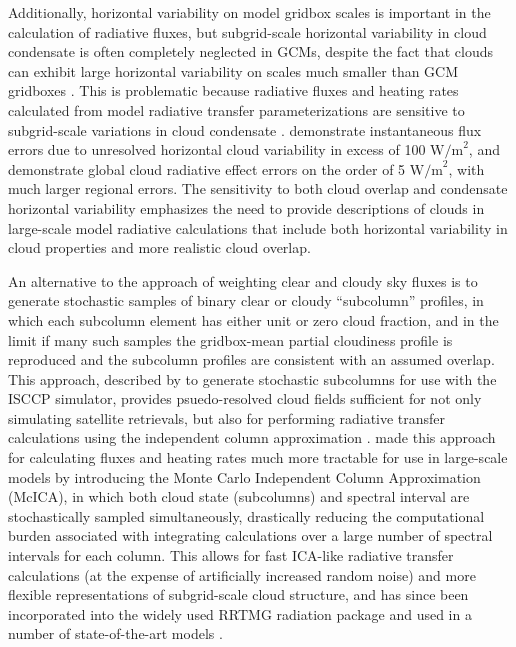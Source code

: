 Additionally, horizontal variability on model gridbox scales is
important in the calculation of radiative fluxes, but subgrid-scale
horizontal variability in cloud condensate is often completely neglected
in GCMs, despite the fact that clouds can exhibit large horizontal
variability on scales much smaller than GCM gridboxes
\citep[e.g.,][]{stephens_and_platt_1987}. This is problematic because
radiative fluxes and heating rates calculated from model radiative
transfer parameterizations are sensitive to subgrid-scale variations in
cloud condensate
\citep[e.g.,][]{barker_et_al_1999, wu_and_liang_2005, oreopoulos_et_al_2012}.
\citet{barker_et_al_1999} demonstrate instantaneous flux errors due to
unresolved horizontal cloud variability in excess of 100
\(\textrm{W/m}^2\), and \citet{oreopoulos_et_al_2012} demonstrate global
cloud radiative effect errors on the order of 5 \(\textrm{W/m}^2\), with
much larger regional errors. The sensitivity to both cloud overlap and
condensate horizontal variability emphasizes the need to provide
descriptions of clouds in large-scale model radiative calculations that
include both horizontal variability in cloud properties and more
realistic cloud overlap.

An alternative to the approach of weighting clear and cloudy sky fluxes
is to generate stochastic samples of binary clear or cloudy
``subcolumn'' profiles, in which each subcolumn element has either unit
or zero cloud fraction, and in the limit if many such samples the
gridbox-mean partial cloudiness profile is reproduced and the subcolumn
profiles are consistent with an assumed overlap. This approach,
described by \citet{klein_and_jakob_1999} to generate stochastic
subcolumns for use with the ISCCP simulator, provides psuedo-resolved
cloud fields sufficient for not only simulating satellite retrievals,
but also for performing radiative transfer calculations using the
independent column approximation \citep[ICA;][]{cahalan_et_al_1994}.
\citet{pincus_et_al_2003} made this approach for calculating fluxes and
heating rates much more tractable for use in large-scale models by
introducing the Monte Carlo Independent Column Approximation (McICA), in
which both cloud state (subcolumns) and spectral interval are
stochastically sampled simultaneously, drastically reducing the
computational burden associated with integrating calculations over a
large number of spectral intervals for each column. This allows for fast
ICA-like radiative transfer calculations (at the expense of artificially
increased random noise) and more flexible representations of
subgrid-scale cloud structure, and has since been incorporated into the
widely used RRTMG radiation package and used in a number of
state-of-the-art models
\citep{iacono_et_al_2008, von_salzen_et_al_2012, neale_et_al_2010a, neale_et_al_2010b, donner_et_al_2011, hogan_et_al_2014}.

